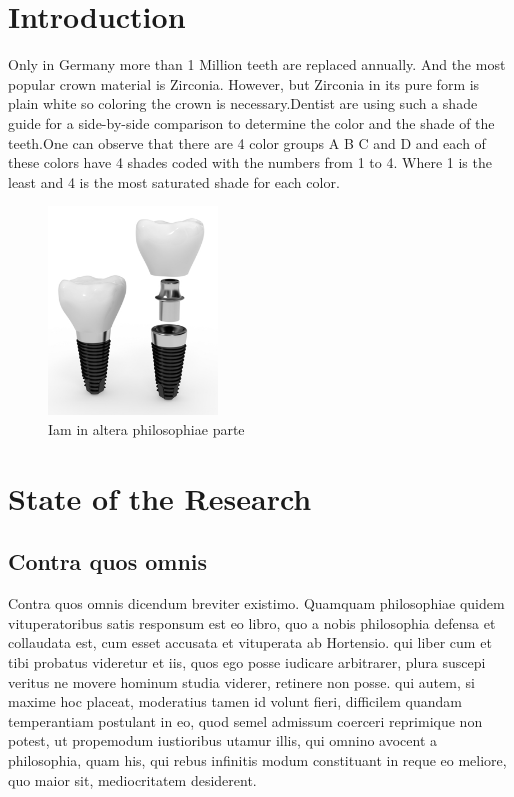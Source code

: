 \cleardoublepage
{}


\chapter{Introduction}
\label{sec:problemstellung}
 Only in Germany more than 1 Million teeth are replaced annually.
 And the most popular crown material is Zirconia. However, but Zirconia in its pure form is plain white so coloring the crown is necessary.Dentist are using such a shade guide for a side-by-side comparison to determine the color and the shade of the teeth.One can observe that there are 4 color groups A B C and D and each of these colors have 4 shades coded with the numbers from 1 to 4. Where 1 is the least and 4 is the most saturated shade for each color. 
 
 \begin{figure}[h]
 	\centering
 	\includegraphics[width=0.4\textwidth]{grafiken/implant.png}
 	\caption{Iam in altera philosophiae parte}
 	\label{fig:bild1}
 \end{figure}

\chapter{State of the Research}
\label{sec:stand_forschung}
\section{Contra quos omnis}
Contra quos omnis dicendum breviter existimo. Quamquam philosophiae quidem vituperatoribus satis responsum est eo libro, quo a nobis philosophia defensa et collaudata est, cum esset accusata et vituperata ab Hortensio. qui liber cum et tibi probatus videretur et iis, quos ego posse iudicare arbitrarer, plura suscepi veritus ne movere hominum studia viderer, retinere non posse. \citet{autor1} qui autem, si maxime hoc placeat, moderatius tamen id volunt fieri, difficilem quandam temperantiam postulant in eo, quod semel admissum coerceri reprimique non potest, ut propemodum iustioribus utamur illis, qui omnino avocent a philosophia, quam his, qui rebus infinitis modum constituant in reque eo meliore, quo maior sit, mediocritatem desiderent. \citep{autor2}

